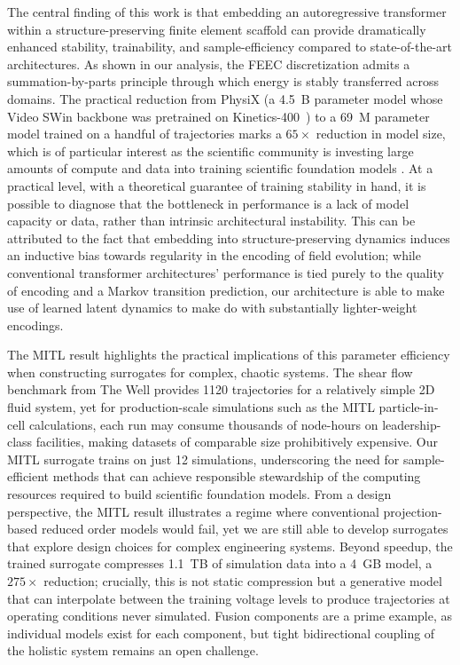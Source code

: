 \documentclass[12pt]{article}
\begin{document}
The central finding of this work is that embedding an autoregressive transformer within a structure-preserving finite element scaffold can provide dramatically enhanced stability, trainability, and sample-efficiency compared to state-of-the-art architectures. As shown in our analysis, the FEEC discretization admits a summation-by-parts principle through which energy is stably transferred across domains. The practical reduction from PhysiX (a 4.5~B parameter model whose Video SWin backbone was pretrained on Kinetics-400~\cite{Liu_2021_ICCV}) to a 69~M parameter model trained on a handful of trajectories marks a $65\times$ reduction in model size, which is of particular interest as the scientific community is investing large amounts of compute and data into training scientific foundation models \cite{nasem2025foundation}. At a practical level, with a theoretical guarantee of training stability in hand, it is possible to diagnose that the bottleneck in performance is a lack of model capacity or data, rather than intrinsic architectural instability. This can be attributed to the fact that embedding into structure-preserving dynamics induces an inductive bias towards regularity in the encoding of field evolution; while conventional transformer architectures' performance is tied purely to the quality of encoding and a Markov transition prediction, our architecture is able to make use of learned latent dynamics to make do with substantially lighter-weight encodings.

The MITL result highlights the practical implications of this parameter efficiency when constructing surrogates for complex, chaotic systems. The shear flow benchmark from The Well \cite{ohana2024well} provides 1120 trajectories for a relatively simple 2D fluid system, yet for production-scale simulations such as the MITL particle-in-cell calculations, each run may consume thousands of node-hours on leadership-class facilities, making datasets of comparable size prohibitively expensive. Our MITL surrogate trains on just 12 simulations, underscoring the need for sample-efficient methods that can achieve responsible stewardship of the computing resources required to build scientific foundation models. From a design perspective, the MITL result illustrates a regime where conventional projection-based reduced order models would fail, yet we are still able to develop surrogates that explore design choices for complex engineering systems. Beyond speedup, the trained surrogate compresses 1.1~TB of simulation data into a 4~GB model, a $275\times$ reduction; crucially, this is not static compression but a generative model that can interpolate between the training voltage levels to produce trajectories at operating conditions never simulated. Fusion components are a prime example, as individual models exist for each component, but tight bidirectional coupling of the holistic system remains an open challenge. 
\end{document}
